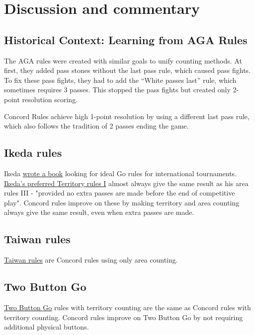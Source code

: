 \documentclass[11pt]{article}
\begin{document}
\newpage

\section*{Discussion and commentary}

\subsection*{Historical Context: Learning from AGA Rules}

The AGA rules were created with similar goals to unify counting methods.
At first, they added pass stones without the last pass rule, which caused pass fights.
To fix these pass fights, they had to add the ``White passes last'' rule, which sometimes requires 3 passes.
This stopped the pass fights but created only 2-point resolution scoring.

Concord Rules achieve high 1-point resolution by using a different last pass rule, which also follows the tradition of 2 passes ending the game.

\subsection*{Ikeda rules}
Ikeda \href{https://gobase.org/studying/rules/ikeda/}{wrote a book} looking for ideal Go rules for international tournaments.
\href{https://gobase.org/studying/rules/ikeda/?sec=e_rules}{Ikeda's preferred Territory rules I} almost always give the same result as his area rules III
- "provided no extra passes are made before the end of competitive play".
Concord rules improve on these by making territory and area counting always give the same result, even when extra passes are made.

\subsection*{Taiwan rules}
\href{https://senseis.xmp.net/?TaiwanRules}{Taiwan rules} are Concord rules using only area counting.

\subsection*{Two Button Go}
\href{https://senseis.xmp.net/?TwoButtonGo}{Two Button Go} rules with territory counting are the same as Concord rules with territory counting.
Concord rules improve on Two Button Go by not requiring additional physical buttons.
\end{document}
